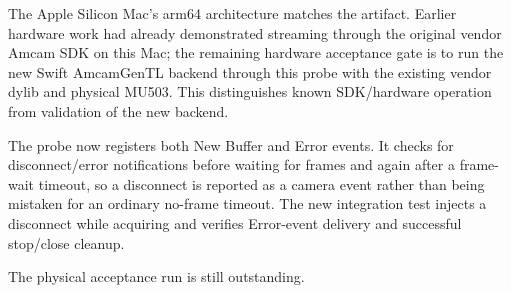 \documentclass[11pt,a4paper]{report}
\begin{document}
The Apple Silicon Mac's arm64 architecture matches the artifact. Earlier hardware work had already demonstrated streaming through the original vendor Amcam SDK on this Mac; the remaining hardware acceptance gate is to run the new Swift AmcamGenTL backend through this probe with the existing vendor dylib and physical MU503. This distinguishes known SDK/hardware operation from validation of the new backend.

The probe now registers both New Buffer and Error events. It checks for disconnect/error notifications before waiting for frames and again after a frame-wait timeout, so a disconnect is reported as a camera event rather than being mistaken for an ordinary no-frame timeout. The new integration test injects a disconnect while acquiring and verifies Error-event delivery and successful stop/close cleanup.

The physical acceptance run is still outstanding.
\end{document}

